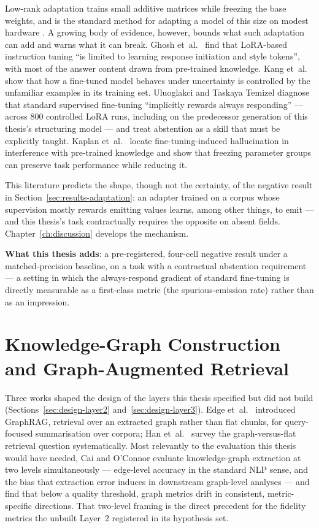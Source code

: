 Low-rank adaptation trains small additive matrices while freezing the base weights, and is
the standard method for adapting a model of this size on modest hardware \parencite{hu2021lora}.
A growing body of evidence, however, bounds what such adaptation can add and warns what it
can break. Ghosh et~al.\ \parencite{ghosh2024limitations} find that \ac{LoRA}-based instruction tuning
``is limited to learning response initiation and style tokens'', with most of the answer
content drawn from pre-trained knowledge. Kang et~al.\ \parencite{kang2024unfamiliar} show that how a
fine-tuned model behaves under uncertainty is controlled by the unfamiliar examples in its
training set. Uluoglakci and Taskaya Temizel \parencite{uluoglakci2026humility} diagnose that
standard supervised fine-tuning ``implicitly rewards always responding'' --- across 800
controlled \ac{LoRA} runs, including on the predecessor generation of this thesis's
structuring model --- and treat abstention as a skill that must be explicitly taught.
Kaplan et~al.\ \parencite{kaplan2026why} locate fine-tuning-induced hallucination in
interference with pre-trained knowledge and show that freezing parameter groups can
preserve task performance while reducing it.

This literature predicts the shape, though not the certainty, of the negative result in
Section~\ref{sec:results-adaptation}: an adapter trained on a corpus whose supervision mostly
rewards emitting values learns, among other things, to emit --- and this thesis's task
contractually requires the opposite on absent fields. Chapter~\ref{ch:discussion} develops
the mechanism.

\textbf{What this thesis adds}: a pre-registered, four-cell negative result under a
matched-precision baseline, on a task with a contractual abstention requirement --- a
setting in which the always-respond gradient of standard fine-tuning is directly measurable
as a first-class metric (the spurious-emission rate) rather than as an impression.

\section{Knowledge-Graph Construction and Graph-Augmented Retrieval}
\label{sec:rw-kg}

Three works shaped the design of the layers this thesis specified but did not build
(Sections~\ref{sec:design-layer2} and~\ref{sec:design-layer3}). Edge et~al.\ \parencite{edge2024graphrag}
introduced GraphRAG, retrieval over an
extracted graph rather than flat chunks, for query-focused summarisation over corpora;
Han et~al.\ \parencite{han2025} survey the graph-versus-flat retrieval question
systematically. Most relevantly to the evaluation this thesis would have
needed, Cai and O'Connor \parencite{cai2025} evaluate knowledge-graph extraction at two levels simultaneously
--- edge-level accuracy in the standard \ac{NLP} sense, and the bias that extraction error
induces in downstream graph-level analyses --- and find that below a quality threshold,
graph metrics drift in consistent, metric-specific directions. That
two-level framing is the direct precedent for the fidelity metrics the unbuilt Layer~2
registered in its hypothesis set.

